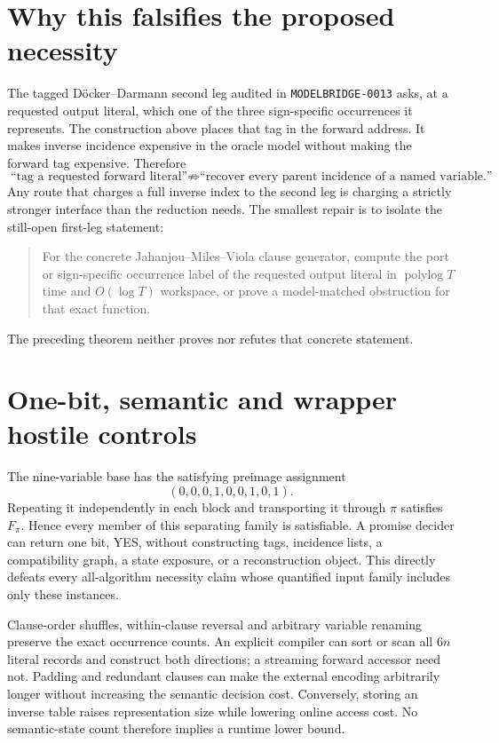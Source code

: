 \documentclass[11pt]{article}
\begin{document}
\section{Why this falsifies the proposed necessity}

The tagged D\"ocker--Darmann second leg audited in
\texttt{MODELBRIDGE-0013} asks, at a requested output literal, which one of
the three sign-specific occurrences it represents.  The construction above
places that tag in the forward address.  It makes inverse incidence expensive
in the oracle model without making the forward tag expensive.  Therefore
\[
\text{``tag a requested forward literal''}
\not\Rightarrow
\text{``recover every parent incidence of a named variable.''}
\]
Any route that charges a full inverse index to the second leg is charging a
strictly stronger interface than the reduction needs.  The smallest repair is
to isolate the still-open first-leg statement:
\begin{quote}
For the concrete Jahanjou--Miles--Viola clause generator, compute the port or
sign-specific occurrence label of the requested output literal in
$\operatorname{polylog} T$ time and $O(\log T)$ workspace, or prove a
model-matched obstruction for that exact function.
\end{quote}
The preceding theorem neither proves nor refutes that concrete statement.

\section{One-bit, semantic and wrapper hostile controls}

The nine-variable base has the satisfying preimage assignment
\[
(0,0,0,1,0,0,1,0,1).
\]
Repeating it independently in each block and transporting it through $\pi$
satisfies $F_\pi$.  Hence every member of this separating family is
satisfiable.  A promise decider can return one bit, YES, without constructing
tags, incidence lists, a compatibility graph, a state exposure, or a
reconstruction object.  This directly defeats every all-algorithm necessity
claim whose quantified input family includes only these instances.

Clause-order shuffles, within-clause reversal and arbitrary variable
renaming preserve the exact occurrence counts.  An explicit compiler can
sort or scan all $6n$ literal records and construct both directions; a
streaming forward accessor need not.  Padding and redundant clauses can make
the external encoding arbitrarily longer without increasing the semantic
decision cost.  Conversely, storing an inverse table raises representation
size while lowering online access cost.  No semantic-state count therefore
implies a runtime lower bound.
\end{document}
